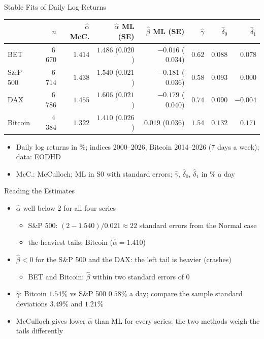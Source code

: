 \begin{frame}{Stable Fits of Daily Log Returns}
\itemsize{\small}
\begin{center}
\footnotesize
\begin{tabular}{lrrrrrrr}
\toprule
& $n$ & $\hat\alpha$ McC. & $\hat\alpha$ ML (SE) & $\hat\beta$ ML (SE) & $\hat\gamma$ & $\hat\delta_0$ & $\hat\delta_1$ \\
\midrule
BET & 6\,670 & $1.414$ & $1.486$ ($0.020$) & $-0.016$ ($0.034$) & $0.62$ & $0.088$ & $0.078$ \\
S\&P 500 & 6\,714 & $1.438$ & $1.540$ ($0.021$) & $-0.181$ ($0.036$) & $0.58$ & $0.093$ & $0.000$ \\
DAX & 6\,786 & $1.455$ & $1.606$ ($0.021$) & $-0.179$ ($0.040$) & $0.74$ & $0.090$ & $-0.004$ \\
Bitcoin & 4\,384 & $1.322$ & $1.410$ ($0.026$) & $0.019$ ($0.036$) & $1.54$ & $0.132$ & $0.171$ \\
\bottomrule
\end{tabular}
\end{center}
\begin{itemize}
    \item Daily log returns in \%; indices 2000--2026, Bitcoin 2014--2026 (7 days a week); data: EODHD
    \item McC.: McCulloch; ML in S0 with standard errors; $\hat\gamma$, $\hat\delta_0$, $\hat\delta_1$ in \% a day
\end{itemize}
\end{frame}

\begin{frame}{Reading the Estimates}
\itemsize{\small}
\begin{itemize}
    \item $\hat\alpha$ well below 2 for all four series
    \begin{itemize}
        \item S\&P 500: $(2 - 1.540)/0.021 \approx 22$ standard errors from the Normal case
        \item the heaviest tails: Bitcoin ($\hat\alpha = 1.410$)
    \end{itemize}
    \item $\hat\beta < 0$ for the S\&P 500 and the DAX: the left tail is heavier (crashes)
    \begin{itemize}
        \item BET and Bitcoin: $\hat\beta$ within two standard errors of 0
    \end{itemize}
    \item $\hat\gamma$: Bitcoin $1.54\%$ vs S\&P 500 $0.58\%$ a day; compare the sample standard deviations $3.49\%$ and $1.21\%$
    \item McCulloch gives lower $\hat\alpha$ than ML for every series: the two methods weigh the tails differently
\end{itemize}
\end{frame}

